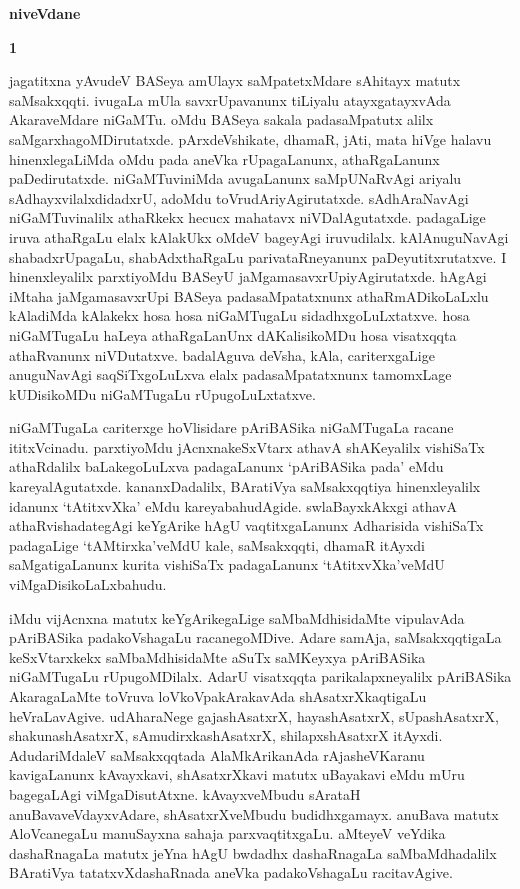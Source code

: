 \begin{center}
{\Huge\bfseries niveVdane}
\end{center}

\bigskip

\centerline{\large\bfseries 1}
\medskip

jagatitxna yAvudeV BASeya amUlayx saMpatetxMdare sAhitayx matutx saMsakxqqti. ivugaLa mUla savxrUpavanunx tiLiyalu atayxgatayxvAda AkaraveMdare niGaMTu. oMdu BASeya sakala padasaMpatutx alilx saMgarxhagoMDirutatxde. pArxdeVshikate, dhamaR, jAti, mata hiVge halavu hinenxlegaLiMda oMdu pada aneVka rUpagaLanunx, athaRgaLanunx paDedirutatxde. niGaMTuviniMda avugaLanunx saMpUNaRvAgi ariyalu sAdhayxvilalxdidadxrU, adoMdu toVrudAriyAgirutatxde. sAdhAraNavAgi niGaMTuvinalilx athaRkekx hecucx mahatavx niVDalAgutatxde. padagaLige iruva athaRgaLu elalx kAlakUkx oMdeV bageyAgi iruvudilalx. kAlAnuguNavAgi shabadxrUpagaLu, shabAdxthaRgaLu parivataRneyanunx paDeyutitxrutatxve. I hinenxleyalilx parxtiyoMdu BASeyU jaMgamasavxrUpiyAgirutatxde. hAgAgi iMtaha jaMgamasavxrUpi BASeya padasaMpatatxnunx athaRmADikoLaLxlu kAladiMda kAlakekx hosa hosa niGaMTugaLu sidadhxgoLuLxtatxve. hosa niGaMTugaLu haLeya athaRgaLanUnx dAKalisikoMDu hosa visatxqqta athaRvanunx niVDutatxve. badalAguva deVsha, kAla, cariterxgaLige anuguNavAgi saqSiTxgoLuLxva elalx padasaMpatatxnunx tamomxLage kUDisikoMDu niGaMTugaLu rUpugoLuLxtatxve.

\medskip

niGaMTugaLa cariterxge hoVlisidare pAriBASika niGaMTugaLa racane ititxVcinadu. parxtiyoMdu jAcnxnakeSxVtarx athavA shAKeyalilx vishiSaTx athaRdalilx baLakegoLuLxva padagaLanunx `pAriBASika pada' eMdu kareyalAgutatxde. kananxDadalilx, BAratiVya saMsakxqqtiya hinenxle\-yalilx idanunx `tAtitxvXka' eMdu kareyabahudAgide. swlaBayxkAkxgi athavA athaRvishadategAgi keYgArike hAgU vaqtitxgaLanunx Adharisida vishiSaTx padagaLige `tAMtirxka'veMdU kale, saMsakxqqti, dhamaR itAyxdi saMgatigaLanunx kurita vishiSaTx padagaLanunx `tAtitxvXka'veMdU viMgaDisi\-koLaLxbahudu.

\medskip

iMdu vijAcnxna matutx keYgArikegaLige saMbaMdhisidaMte vipulavAda pAriBASika padakoVshagaLu racanegoMDive. Adare samAja, saMsakxqqtigaLa keSxVtarxkekx saMbaMdhisidaMte aSuTx saMKeyxya pAriBASika niGaMTugaLu rUpugoMDilalx. AdarU visatxqqta parikalapxneyalilx pAriBASika AkaragaLaMte toVruva loVkoVpakArakavAda shAsatxrXkaqtigaLu heVraLavAgive. udAharaNege gajashAsatxrX, hayashAsatxrX, sUpashAsatxrX, shakunashAsatxrX, sAmudirxkashAsatxrX, shilapxshAsatxrX itAyxdi. AdudariMdaleV saMsakxqqtada AlaMkArikanAda rAjasheVKaranu kavigaLanunx kAvayxkavi, shAsatxrXkavi matutx uBayakavi eMdu mUru bagegaLAgi viMgaDisutAtxne. kAvayxveMbudu sArataH anuBavaveVdayxvAdare, shAsatxrXveMbudu budidhx\-gamayx. anuBava matutx AloVcanegaLu manuSayxna sahaja parxvaqtitxgaLu. aMteyeV veYdika dashaRnagaLa matutx jeYna hAgU bwdadhx dashaRnagaLa saMbaMdhadalilx BAratiVya tatatxvXdashaRnada aneVka padakoVshagaLu racitavAgive.

